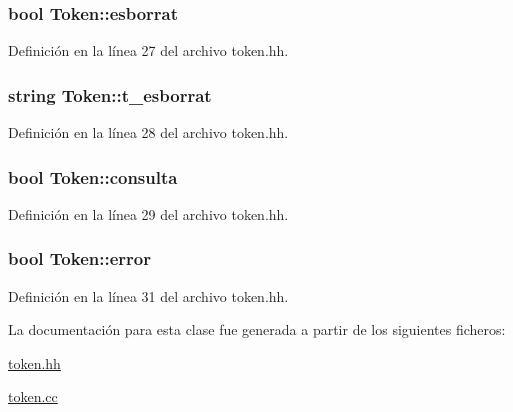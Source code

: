 \hypertarget{class_token_a696eb24f3f0cce53d3b062973013c347}{
\subsubsection[{esborrat}]{\setlength{\rightskip}{0pt plus 5cm}bool Token\-::esborrat\hspace{0.3cm}{\ttfamily [private]}}}\label{class_token_a696eb24f3f0cce53d3b062973013c347}


Definición en la línea 27 del archivo token.\-hh.

\hypertarget{class_token_a4ebbfc5ad34b5a4e9220789cbf0dfafe}{
\subsubsection[{t\-\_\-esborrat}]{\setlength{\rightskip}{0pt plus 5cm}string Token\-::t\-\_\-esborrat\hspace{0.3cm}{\ttfamily [private]}}}\label{class_token_a4ebbfc5ad34b5a4e9220789cbf0dfafe}


Definición en la línea 28 del archivo token.\-hh.

\hypertarget{class_token_a4479e876476db5ccd360ad3906d47eff}{
\subsubsection[{consulta}]{\setlength{\rightskip}{0pt plus 5cm}bool Token\-::consulta\hspace{0.3cm}{\ttfamily [private]}}}\label{class_token_a4479e876476db5ccd360ad3906d47eff}


Definición en la línea 29 del archivo token.\-hh.

\hypertarget{class_token_a087a46025ff3eb94c844aba0204ce08a}{
\subsubsection[{error}]{\setlength{\rightskip}{0pt plus 5cm}bool Token\-::error\hspace{0.3cm}{\ttfamily [private]}}}\label{class_token_a087a46025ff3eb94c844aba0204ce08a}


Definición en la línea 31 del archivo token.\-hh.



La documentación para esta clase fue generada a partir de los siguientes ficheros\-:\begin{DoxyCompactItemize}
\item 
\hyperlink{token_8hh}{token.\-hh}\item 
\hyperlink{token_8cc}{token.\-cc}\end{DoxyCompactItemize}
